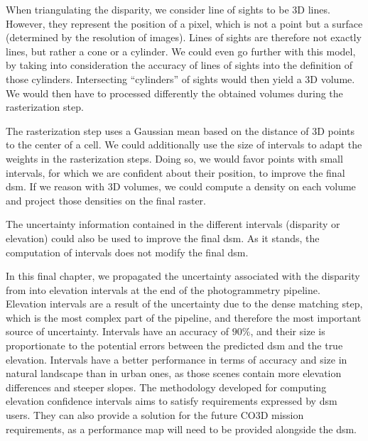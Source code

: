 When triangulating the disparity, we consider line of sights to be 3D lines. However, they represent the position of a pixel, which is not a point but a surface (determined by the resolution of images). Lines of sights are therefore not exactly lines, but rather a cone or a cylinder.  We could even go further with this model, by taking into consideration the accuracy of lines of sights into the definition of those cylinders. Intersecting ``cylinders'' of sights would then yield a 3D volume. We would then have to processed differently the obtained volumes during the rasterization step. 

The rasterization step uses a Gaussian mean based on the distance of 3D points to the center of a cell. We could additionally use the size of intervals to adapt the weights in the rasterization steps. Doing so, we would favor points with small intervals, \ie for which we are confident about their position, to improve the final \acrshort{dsm}. If we reason with 3D volumes, we could compute a density on each volume and project those densities on the final raster. 

The uncertainty information contained in the different intervals (disparity or elevation) could also be used to improve the final \acrshort{dsm}. As it stands, the computation of intervals does not modify the final \acrshort{dsm}.

\begin{conclusion}
    In this final chapter, we propagated the uncertainty associated with the disparity from  into elevation intervals at the end of the photogrammetry pipeline. Elevation intervals are a result of the uncertainty due to the dense matching step, which is the most complex part of the pipeline, and therefore the most important source of uncertainty. Intervals have an accuracy of $90\%$, and their size is proportionate to the potential errors between the predicted \acrshort{dsm} and the true elevation. Intervals have a better performance in terms of accuracy and size in natural landscape than in urban ones, as those scenes contain more elevation differences and steeper slopes. The methodology developed for computing elevation confidence intervals aims to satisfy requirements expressed by \acrshort{dsm} users. They can also provide a solution for the future CO3D mission requirements, as a performance map will need to be provided alongside the \acrshort{dsm}.
\end{conclusion}

\clearpage
